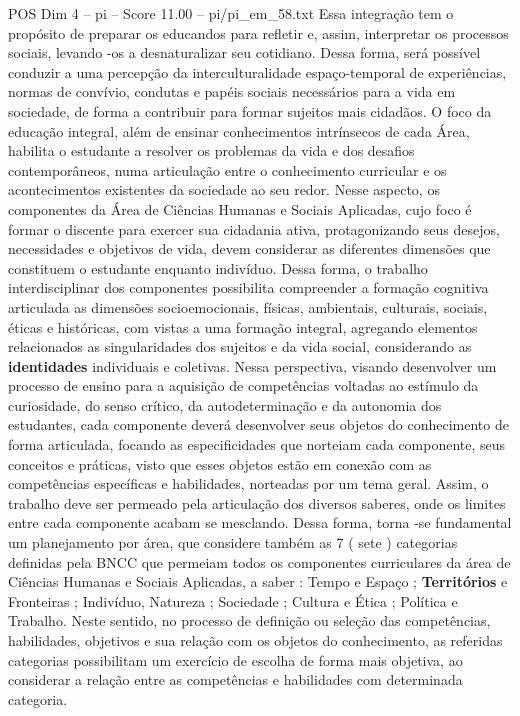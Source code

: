 \begin{textsample}{POS Dim 4 – pi – Score 11.00 – pi/pi\_em\_58.txt}
Essa integração tem o propósito de preparar os educandos para refletir e, assim, interpretar os processos sociais, levando -os a desnaturalizar seu cotidiano.
Dessa forma, será possível conduzir a uma percepção da interculturalidade espaço-temporal de experiências, normas de convívio, condutas e papéis sociais necessários para a vida em sociedade, de forma a contribuir para formar sujeitos mais cidadãos.
O foco da educação integral, além de ensinar conhecimentos intrínsecos de cada Área, habilita o estudante a resolver os problemas da vida e dos desafios contemporâneos, numa articulação entre o conhecimento curricular e os acontecimentos existentes da sociedade ao seu redor.
Nesse aspecto, os componentes da Área de Ciências Humanas e Sociais Aplicadas, cujo foco é formar o discente para exercer sua cidadania ativa, protagonizando seus desejos, necessidades e objetivos de vida, devem considerar as diferentes dimensões que constituem o estudante enquanto indivíduo.
Dessa forma, o trabalho interdisciplinar dos componentes possibilita compreender a formação cognitiva articulada as dimensões socioemocionais, físicas, ambientais, culturais, sociais, éticas e históricas, com vistas a uma formação integral, agregando elementos relacionados as singularidades dos sujeitos e da vida social, considerando as \textbf{identidades} individuais e coletivas.
Nessa perspectiva, visando desenvolver um processo de ensino para a aquisição de competências voltadas ao estímulo da curiosidade, do senso crítico, da autodeterminação e da autonomia dos estudantes, cada componente deverá desenvolver seus objetos do conhecimento de forma articulada, focando as especificidades que norteiam cada componente, seus conceitos e práticas, visto que esses objetos estão em conexão com as competências específicas e habilidades, norteadas por um tema geral.
Assim, o trabalho deve ser permeado pela articulação dos diversos saberes, onde os limites entre cada componente acabam se mesclando.
Dessa forma, torna -se fundamental um planejamento por área, que considere também as 7 ( sete ) categorias definidas pela BNCC que permeiam todos os componentes curriculares da área de Ciências Humanas e Sociais Aplicadas, a saber : Tempo e Espaço ; \textbf{Territórios} e Fronteiras ; Indivíduo, Natureza ; Sociedade ; Cultura e Ética ; Política e Trabalho.
Neste sentido, no processo de definição ou seleção das competências, habilidades, objetivos e sua relação com os objetos do conhecimento, as referidas categorias possibilitam um exercício de escolha de forma mais objetiva, ao considerar a relação entre as competências e habilidades com determinada categoria.

\end{textsample}
